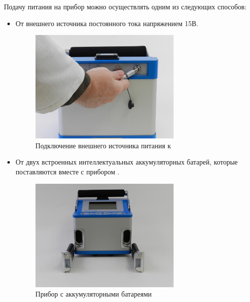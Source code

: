 Подачу питания на прибор \cg{} можно осуществлять одним
из следующих способов:
\begin{itemize}
  \item От внешнего источника постоянного тока напряжением 15В.

    \begin{figure}[h]
      \centering
      \includegraphics[width=0.7\textwidth]{figures/connecting_the_power_supply_to_the_cg6_autograv}
      \caption{Подключение внешнего источника питания к \cg{}}
      \label{fig:connecting_the_power_supply_to_the_cg6_autograv}
    \end{figure}

  \item От двух встроенных интеллектуальных аккумуляторных батарей, которые
    поставляются вместе с прибором \cg{}.

    \begin{figure}[h]
      \centering
      \includegraphics[width=0.7\textwidth]{figures/the_cg6_autograv_and_batteries}
      \caption{Прибор \cg{} с аккумуляторными батареями}
      \label{fig:the_cg6_autograv_and_batteries}
    \end{figure}
\end{itemize}


